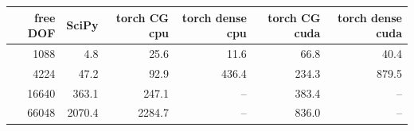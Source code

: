 \begin{tabular}{rrrrrr}
\toprule
free DOF & SciPy & torch CG cpu & torch dense cpu & torch CG cuda & torch dense cuda \\
\midrule
1088 & 4.8 & 25.6 & 11.6 & 66.8 & 40.4 \\
4224 & 47.2 & 92.9 & 436.4 & 234.3 & 879.5 \\
16640 & 363.1 & 247.1 & -- & 383.4 & -- \\
66048 & 2070.4 & 2284.7 & -- & 836.0 & -- \\
\bottomrule
\end{tabular}
